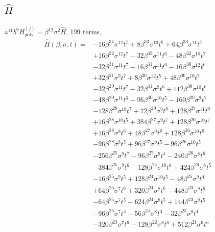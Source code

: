 \subsection*{$\hat H$}
$a^{11}b^9H^{(j)}_{\mathrm{poly}}=\beta^{12}\sigma^2\hat H$. 199 terms.
{\small
\begin{align*}
\hat H(\beta,\sigma,t)={}&-16\beta^{34} \sigma^{12} t^{7}+8\beta^{33} \sigma^{13} t^{6}+64\beta^{33} \sigma^{11} t^{7}\\
&+16\beta^{32} \sigma^{12} t^{7}-32\beta^{33} \sigma^{11} t^{6}-48\beta^{32} \sigma^{10} t^{7}\\
&-32\beta^{31} \sigma^{11} t^{7}-16\beta^{31} \sigma^{11} t^{6}-16\beta^{30} \sigma^{12} t^{6}\\
&+32\beta^{31} \sigma^{9} t^{7}+8\beta^{30} \sigma^{12} t^{5}+48\beta^{30} \sigma^{10} t^{7}\\
&-32\beta^{29} \sigma^{11} t^{7}-32\beta^{31} \sigma^{9} t^{6}+112\beta^{30} \sigma^{10} t^{6}\\
&-48\beta^{29} \sigma^{11} t^{6}-96\beta^{30} \sigma^{10} t^{5}-160\beta^{29} \sigma^{9} t^{7}\\
&-128\beta^{28} \sigma^{10} t^{7}+72\beta^{29} \sigma^{9} t^{6}+128\beta^{27} \sigma^{11} t^{6}\\
&+16\beta^{28} \sigma^{10} t^{5}+384\beta^{27} \sigma^{9} t^{7}+128\beta^{26} \sigma^{10} t^{7}\\
&+16\beta^{28} \sigma^{8} t^{6}+48\beta^{27} \sigma^{9} t^{6}+128\beta^{26} \sigma^{10} t^{6}\\
&-96\beta^{28} \sigma^{8} t^{5}+96\beta^{27} \sigma^{9} t^{5}-96\beta^{26} \sigma^{10} t^{5}\\
&-256\beta^{25} \sigma^{9} t^{7}-96\beta^{27} \sigma^{9} t^{4}-240\beta^{26} \sigma^{8} t^{6}\\
&-384\beta^{25} \sigma^{9} t^{6}-128\beta^{24} \sigma^{10} t^{6}+424\beta^{26} \sigma^{8} t^{5}\\
&-16\beta^{25} \sigma^{9} t^{5}+128\beta^{24} \sigma^{10} t^{5}-48\beta^{25} \sigma^{9} t^{4}\\
&+64\beta^{25} \sigma^{7} t^{6}+320\beta^{24} \sigma^{8} t^{6}-448\beta^{23} \sigma^{9} t^{6}\\
&-64\beta^{25} \sigma^{7} t^{5}-624\beta^{24} \sigma^{8} t^{5}+144\beta^{23} \sigma^{9} t^{5}\\
&-96\beta^{25} \sigma^{7} t^{4}-56\beta^{24} \sigma^{8} t^{4}-32\beta^{23} \sigma^{9} t^{4}\\
&-320\beta^{23} \sigma^{7} t^{6}-128\beta^{22} \sigma^{8} t^{6}+512\beta^{21} \sigma^{9} t^{6}\\

\end{align*}}
